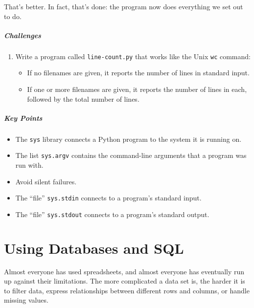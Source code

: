 \documentclass[]{book}
\begin{document}
That's better. In fact, that's done: the program now does everything we
set out to do.

\mbox{}\paragraph{Challenges}

\begin{enumerate}
\item
  Write a program called \texttt{line-count.py} that works like the Unix
  \texttt{wc} command:

  \begin{itemize}
  \item
    If no filenames are given, it reports the number of lines in
    standard input.
  \item
    If one or more filenames are given, it reports the number of lines
    in each, followed by the total number of lines.
  \end{itemize}
\end{enumerate}

\mbox{}\paragraph{Key Points}

\begin{itemize}
\item
  The \texttt{sys} library connects a Python program to the system it is
  running on.
\item
  The list \texttt{sys.argv} contains the command-line arguments that a
  program was run with.
\item
  Avoid silent failures.
\item
  The ``file'' \texttt{sys.stdin} connects to a program's standard
  input.
\item
  The ``file'' \texttt{sys.stdout} connects to a program's standard
  output.
\end{itemize}

\chapter{Using Databases and SQL}\label{using-databases-and-sql}

Almost everyone has used spreadsheets, and almost everyone has
eventually run up against their limitations. The more complicated a data
set is, the harder it is to filter data, express relationships between
different rows and columns, or handle missing values.
\end{document}
